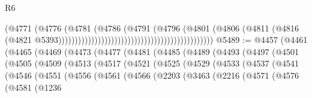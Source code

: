 \begin{lexlean}{R6}
\begin{coremodule}
                                                                            (@4771
                                                                              (@4776
                                                                                (@4781
                                                                                  (@4786
                                                                                    (@4791
                                                                                      (@4796
                                                                                        (@4801
                                                                                          (@4806
                                                                                            (@4811
                                                                                              (@4816
                                                                                                (@4821
                                                                                                  @5393)))))))))))))))))))))))))))))))))))))))))))))))
@5489 := @4457
    (@4461
      (@4465
        (@4469
          (@4473
            (@4477
              (@4481
                (@4485
                  (@4489
                    (@4493
                      (@4497
                        (@4501
                          (@4505
                            (@4509
                              (@4513
                                (@4517
                                  (@4521
                                    (@4525
                                      (@4529
                                        (@4533
                                          (@4537
                                            (@4541
                                              (@4546
                                                (@4551
                                                  (@4556
                                                    (@4561
                                                      (@4566
                                                        (@2203
                                                          (@3463
                                                            (@2216
                                                              (@4571
                                                                (@4576
                                                                  (@4581
                                                                    (@1236

\end{coremodule}
\end{lexlean}
